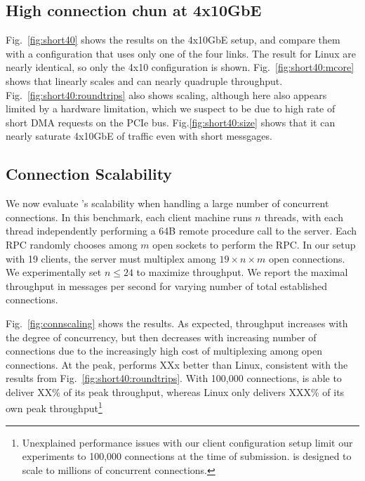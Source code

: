 \subsection{High connection chun at 4x10GbE}
\label{sec:eval:short40}

Fig.~\ref{fig:short40} shows the results on the 4x10GbE setup, and
compare them with a configuration that uses only one of the four
links.  The result for Linux are nearly identical, so only the 4x10
configuration is shown.  Fig.~\ref{fig:short40:mcore} shows that \ix
linearly scales and can nearly quadruple throughput.
Fig.~\ref{fig:short40:roundtrips} also shows scaling, although here
also appears limited by a hardware limitation, which we suspect to be
due to high rate of short DMA requests on the PCIe bus.
Fig.\ref{fig:short40:size} shows that it can nearly saturate 4x10GbE
of traffic even with short messgages.

\subsection{Connection Scalability}


\label{sec:eval:scale}

We now evaluate \ix's scalability when handling a large number of
concurrent connections. In this benchmark, each client machine runs
$n$ threads, with each thread independently performing a 64B remote
procedure call to the server.  Each RPC randomly chooses among $m$
open sockets to perform the RPC.  In our setup with 19 clients, the
server must multiplex among $19 \times n \times m$ open connections.
We experimentally set $n \leq 24$ to maximize throughput.  We report
the maximal throughput in messages per second for varying number of
total established connections. 


Fig.~\ref{fig:connscaling} shows the results.  As expected, throughput
increases with the degree of concurrency, but then decreases with
increasing number of connections due to the increasingly high cost of
multiplexing among open connections.  At the peak, \ix performs XXx
better than Linux, consistent with the results from
Fig.~\ref{fig:short40:roundtrips}.  With 100,000 connections, \ix is
able to deliver XX\% of its peak throughput, whereas Linux only
delivers XXX\% of its own peak throughput\footnote{Unexplained
  performance issues with our client configuration setup limit our
  experiments to 100,000 connections at the time of submission. \ix is
  designed to scale to millions of concurrent connections.}


